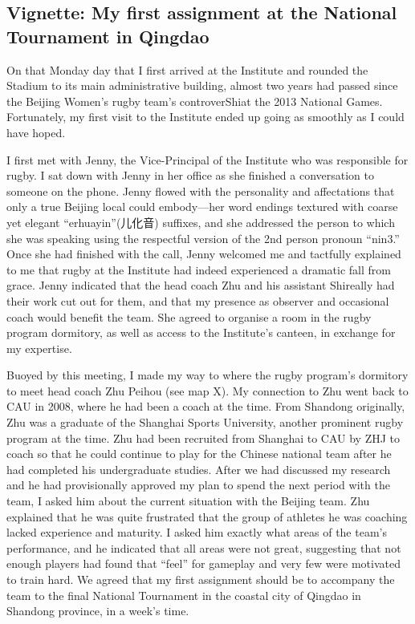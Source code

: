                                           \begin{CJK}{UTF8}{gbsn}

\section{Vignette: My first assignment at the National Tournament in Qingdao}

On that Monday day that I first arrived at the Institute and rounded the Stadium to its main administrative building, almost two years had passed since the Beijing Women's rugby team's controverShiat the 2013 National Games.  Fortunately, my first visit to the Institute ended up going as smoothly as I could have hoped.

I first met with Jenny, the Vice-Principal of the Institute who was responsible for rugby.  I sat down with Jenny in her office as she finished a conversation to someone on the phone. Jenny flowed with the personality and affectations that only a true Beijing local could embody---her word endings textured with coarse yet elegant ``erhuayin''(儿化音) suffixes, and she addressed the person to which she was speaking using the respectful version of the 2nd person pronoun ``nin3.''  Once she had finished with the call, Jenny welcomed me and tactfully explained to me that rugby at the Institute had indeed experienced a dramatic fall from grace.  Jenny indicated that the head coach Zhu and his assistant Shireally had their work cut out for them, and that my presence as observer and occasional coach would benefit the team.  She agreed to organise a room in the rugby program dormitory, as well as access to the Institute's canteen, in exchange for my expertise.

Buoyed by this meeting, I made my way to where the rugby program's dormitory to meet head coach Zhu Peihou (see map X).  My connection to Zhu went back to CAU in 2008, where he had been a coach at the time. From Shandong originally, Zhu was a graduate of the Shanghai Sports University, another prominent rugby program at the time.  Zhu had been recruited from Shanghai to CAU by ZHJ to coach so that he could continue to play for the Chinese national team after he had completed his undergraduate studies.  After we had discussed my research and he had provisionally approved my plan to spend the next period with the team, I asked him about the current situation with the Beijing team.  Zhu explained that he was quite frustrated that the group of athletes he was coaching lacked experience and maturity. I asked him exactly what areas of the team's performance, and he indicated that all areas were not great, suggesting that not enough players had found that ``feel'' for gameplay and very few were motivated to train hard.  We agreed that my first assignment should be to accompany the team to the final National Tournament in the coastal city of Qingdao in Shandong province, in a week's time.


\end{CJK}
